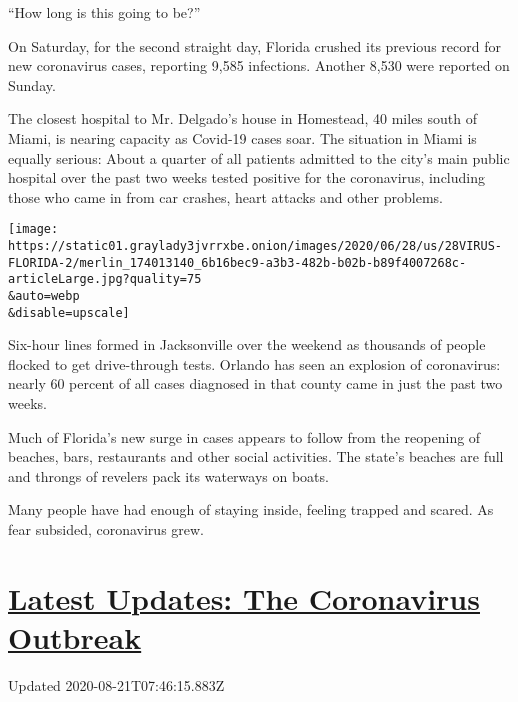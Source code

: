 ``How long is this going to be?''

On Saturday, for the second straight day, Florida crushed its previous
record for new coronavirus cases, reporting 9,585 infections. Another
8,530 were reported on Sunday.

The closest hospital to Mr. Delgado's house in Homestead, 40 miles south
of Miami, is nearing capacity as Covid-19 cases soar. The situation in
Miami is equally serious: About a quarter of all patients admitted to
the city's main public hospital over the past two weeks tested positive
for the coronavirus, including those who came in from car crashes, heart
attacks and other problems.

\texttt{[image: https://static01.graylady3jvrrxbe.onion/images/2020/06/28/us/28VIRUS-FLORIDA-2/merlin\_174013140\_6b16bec9-a3b3-482b-b02b-b89f4007268c-articleLarge.jpg?quality=75\\\&auto=webp\\\&disable=upscale]}

Six-hour lines formed in Jacksonville over the weekend as thousands of
people flocked to get drive-through tests. Orlando has seen an explosion
of coronavirus: nearly 60 percent of all cases diagnosed in that county
came in just the past two weeks.

Much of Florida's new surge in cases appears to follow from the
reopening of beaches, bars, restaurants and other social activities. The
state's beaches are full and throngs of revelers pack its waterways on
boats.

Many people have had enough of staying inside, feeling trapped and
scared. As fear subsided, coronavirus grew.

\hypertarget{latest-updates-the-coronavirus-outbreak}{%
\section{\texorpdfstring{\href{https://www.nytimes3xbfgragh.onion/2020/08/20/world/coronavirus-covid.html?action=click\&pgtype=Article\&state=default\&region=MAIN_CONTENT_1\&context=storylines_live_updates}{Latest
Updates: The Coronavirus
Outbreak}}{Latest Updates: The Coronavirus Outbreak}}\label{latest-updates-the-coronavirus-outbreak}}

Updated 2020-08-21T07:46:15.883Z

